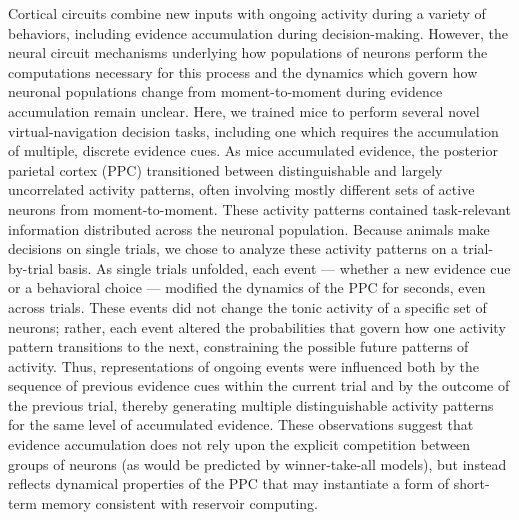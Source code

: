 
\noindent Cortical circuits combine new inputs with ongoing activity during a variety of behaviors, including evidence accumulation during decision-making. However, the neural circuit mechanisms underlying how populations of neurons perform the computations necessary for this process and the dynamics which govern how neuronal populations change from moment-to-moment during evidence accumulation remain unclear. Here, we trained mice to perform several novel virtual-navigation decision tasks, including one which requires the accumulation of multiple, discrete evidence cues. As mice accumulated evidence, the posterior parietal cortex (PPC) transitioned between distinguishable and largely uncorrelated activity patterns, often involving mostly different sets of active neurons from moment-to-moment. These activity patterns contained task-relevant information distributed across the neuronal population. Because animals make decisions on single trials, we chose to analyze these activity patterns on a trial-by-trial basis. As single trials unfolded, each event — whether a new evidence cue or a behavioral choice — modified the dynamics of the PPC for seconds, even across trials. These events did not change the tonic activity of a specific set of neurons; rather, each event altered the probabilities that govern how one activity pattern transitions to the next, constraining the possible future patterns of activity. Thus, representations of ongoing events were influenced both by the sequence of previous evidence cues within the current trial and by the outcome of the previous trial, thereby generating multiple distinguishable activity patterns for the same level of accumulated evidence. These observations suggest that evidence accumulation does not rely upon the explicit competition between groups of neurons (as would be predicted by winner-take-all models), but instead reflects dynamical properties of the PPC that may instantiate a form of short-term memory consistent with reservoir computing.



